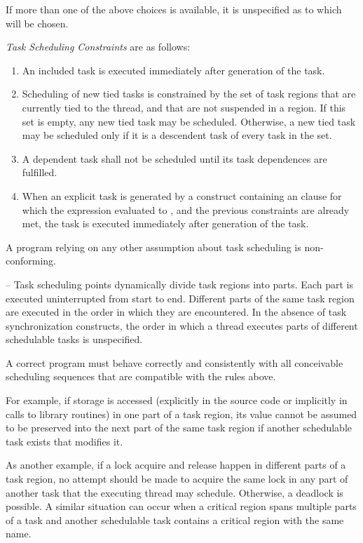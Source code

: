 If more than one of the above choices is available, it is unspecified as to which will be 
chosen.

\emph{Task Scheduling Constraints} are as follows:

\begin{enumerate}
\item An included task is executed immediately after generation of the task.

\item Scheduling of new tied tasks is constrained by the set of task regions that are currently 
tied to the thread, and that are not suspended in a  region. If this set is empty, 
any new tied task may be scheduled. Otherwise, a new tied task may be scheduled only 
if it is a descendent task of every task in the set.

\item A dependent task shall not be scheduled until its task dependences are fulfilled.

\item When an explicit task is generated by a construct containing an  clause for which the 
expression evaluated to , and the previous constraints are already met, the task is 
executed immediately after generation of the task.
\end{enumerate}

A program relying on any other assumption about task scheduling is non-conforming.

\notestart
\noteheader – Task scheduling points dynamically divide task regions into parts. Each part is 
executed uninterrupted from start to end. Different parts of the same task region are 
executed in the order in which they are encountered. In the absence of task 
synchronization constructs, the order in which a thread executes parts of different 
schedulable tasks is unspecified.

A correct program must behave correctly and consistently with all conceivable 
scheduling sequences that are compatible with the rules above.

For example, if  storage is accessed (explicitly in the source code or 
implicitly in calls to library routines) in one part of a task region, its value cannot be 
assumed to be preserved into the next part of the same task region if another schedulable 
task exists that modifies it.

As another example, if a lock acquire and release happen in different parts of a task 
region, no attempt should be made to acquire the same lock in any part of another task 
that the executing thread may schedule. Otherwise, a deadlock is possible. A similar 
situation can occur when a critical region spans multiple parts of a task and another 
schedulable task contains a critical region with the same name.

